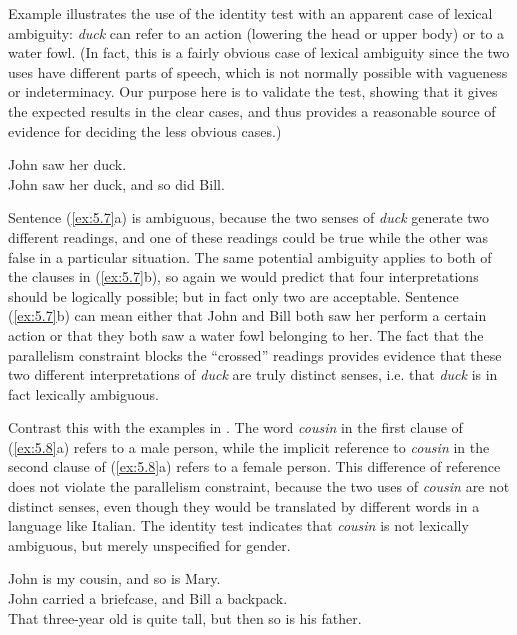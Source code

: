 Example  illustrates the use of the identity test with an apparent case of lexical ambiguity: \textit{duck} can refer to an action (lowering the head or upper body) or to a water fowl. (In fact, this is a fairly obvious case of lexical ambiguity since the two uses have different parts of speech, which is not normally possible with vagueness or indeterminacy. Our purpose here is to validate the test, showing that it gives the expected results in the clear cases, and thus provides a reasonable source of evidence for deciding the less obvious cases.) 




\ea \label{ex:5.7}
\ea John saw her duck.\\
\ex John saw her duck, and so did Bill.
\z
                       \z

Sentence (\ref{ex:5.7}a) is ambiguous, because the two senses of \textit{duck} generate two different readings, and one of these readings could be true while the other was false in a particular situation. The same potential ambiguity applies to both of the clauses in (\ref{ex:5.7}b), so again we would predict that four interpretations should be logically possible; but in fact only two are acceptable. Sentence (\ref{ex:5.7}b) can mean either that John and Bill both saw her perform a certain action or that they both saw a water fowl belonging to her. The fact that the parallelism constraint blocks the “crossed” readings provides evidence that these two different interpretations of \textit{duck} are truly distinct senses, i.e. that \textit{duck} is in fact lexically ambiguous.


Contrast this with the examples in . The word \textit{cousin} in the first clause of (\ref{ex:5.8}a) refers to a male person, while the implicit reference to \textit{cousin} in the second clause of (\ref{ex:5.8}a) refers to a female person. This difference of reference does not violate the parallelism constraint, because the two uses of \textit{cousin} are not distinct senses, even though they would be translated by different words in a language like   {Italian}. The identity test indicates that \textit{cousin} is not lexically ambiguous, but merely unspecified for gender.


\ea \label{ex:5.8}
\ea John is my cousin, and so is Mary.\\
\ex John carried a briefcase, and Bill a backpack.\\
\ex That three-year old is quite tall, but then so is his father.
                       \z
\z



